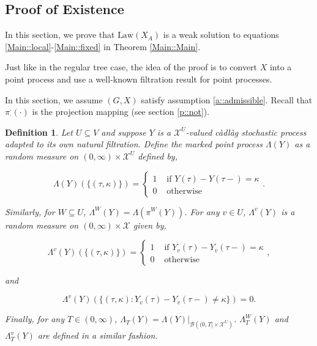 \documentclass[12pt]{article}
\newcommand{\mc}{\mathcal}
\newcommand{\ms}{\mathscr}
\newcommand{\te}{\text}
\newcommand{\ind}{\hspace{24pt}}
\newcommand{\sta}{\mc{X}}							%
\newcommand{\Xf}{X}									%
\newcommand{\proj}{\pi}								%
\newcommand{\vind}[1]{_{#1}}						%
\newcommand{\tme}[1]{(#1)}							%
\newcommand{\vpara}[1]{^{#1}}						%
\newcommand{\tpara}[1]{_{#1}}						%
\newcommand{\Xg}{Y}									%
\newcommand{\pmap}{\Lambda}							%
\newcommand{\rt}{\tau}								%
\renewcommand{\mark}{\kappa}						%
\newcommand{\law}{\te{Law}}							%
\newtheorem{defn}[thms]{Definition}
\begin{document}
\subsection{Proof of Existence}
\label{Ex::Main}

In this section, we prove that \(\law(\Xf\vind{A})\) is a weak solution to equations \eqref{Main::local}-\eqref{Main::fixed} in Theorem \ref{Main::Main}.

Just like in the regular tree case, the idea of the proof is to convert \(\Xf\) into a point process and use a well-known filtration result for point processes.

\ind In this section, we assume \((G,\Xf)\) satisfy assumption \ref{a::admissible}. Recall that \(\proj\vpara{\cdot}\tpara{\cdot}(\cdot)\) is the projection mapping (see section \ref{p::not}).

\begin{defn}
Let \(U\subseteq V\) and suppose \(\Xg\) is a \(\sta^U\)-valued c\`adl\`ag stochastic process adapted to its own natural filtration. Define the marked point process \(\pmap(\Xg)\) as a random measure on \((0,\infty) \times \sta^U\) defined by,

\[\pmap(\Xg)(\{(\rt,\mark)\}) = \begin{cases}
1 &\te{ if } \Xg\tme{\rt} - \Xg\tme{\rt-} = \mark\\
0 &\te{ otherwise}
\end{cases}.\]

Similarly, for \(W \subseteq U\), \(\pmap\vpara{W}(\Xg) = \pmap\left(\proj\vpara{W}(\Xg)\right)\). For any \(v\in U\), \(\pmap\vpara{v}(\Xg)\) is a random measure on \((0,\infty) \times \sta\) given by,

\[\pmap\vpara{v}(\Xg)(\{(\rt,\mark)\}) = \begin{cases}
1 &\te{ if } \Xg\vind{v}\tme{\rt} - \Xg\vind{v}\tme{\rt-} = \mark\\
0 &\te{ otherwise}
\end{cases},\]

and

\[\pmap\vpara{v}(\Xg)(\{(\rt,\mark): \Xg\vind{v}\tme{\rt} - \Xg\vind{v}\tme{\rt-} \neq \mark\}) = 0.\]

Finally, for any \(T\in (0,\infty)\), \(\pmap\tpara{T}(\Xg) = \pmap(\Xg)|_{\ms{B}\left((0,T]\times\sta^U\right)}\). \(\pmap\vpara{W}\tpara{T}(\Xg)\) and \(\pmap\vpara{v}\tpara{T}(\Xg)\) are defined in a similar fashion.
\label{Ex::pmap}
\end{defn}
\end{document}
